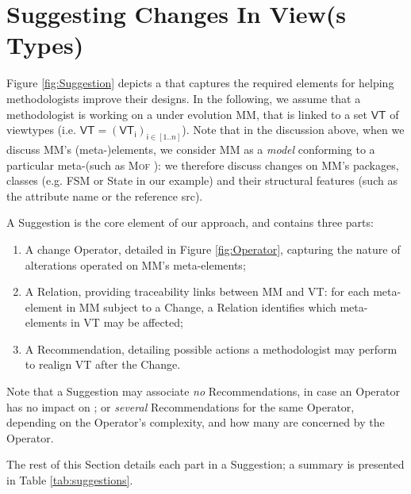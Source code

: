 \section{Suggesting Changes In View(s Types)}
\label{sec:Suggestion}

Figure \ref{fig:Suggestion} depicts a \metamodel that captures the
required elements for helping methodologists improve their designs.
In the following, we assume that a methodologist is working on a \metamodel
under evolution \textsf{MM}, that is linked to a set $\mathsf{VT}$ of viewtypes
(i.e. $\mathsf{VT} = (\mathsf{VT}_\mathsf{i})_{\mathsf{i}\in [1..n]}$). Note that in the discussion above, when we discuss
\textsf{MM}'s (meta-)elements, we consider \textsf{MM} as a \emph{model}
conforming to a particular meta-\metamodel (such as \textsc{Mof} \cite{TR:OMG-MOF:2016}):
we therefore discuss changes on \textsf{MM}'s packages, classes (e.g. 
\textsf{FSM} or \textsf{State} in our example) and their structural features
(such as the attribute \textsf{name} or the reference \textsf{src}).

A \textsf{Suggestion} is the core element of our approach, and contains three 
parts:
\begin{enumerate}
    \item A change \textsf{Operator}, detailed in Figure \ref{fig:Operator}, capturing the nature of
alterations operated on \textsf{MM}'s meta-elements; 
    \item A \textsf{Relation}, providing traceability links between \textsf{MM} and \textsf{VT}: for each meta-element in \textsf{MM} subject to a \textsf{Change}, a \textsf{Relation}
identifies which meta-elements in \textsf{VT} may be affected;
    \item A \textsf{Recommendation}, detailing possible actions a methodologist may perform to realign \textsf{VT} after the \textsf{Change}. 
\end{enumerate}

Note that a \textsf{Suggestion} may 
associate \emph{no} \textsf{Recommendation}s, in case an \textsf{Operator} has no
impact on \viewtypes; or \emph{several} \textsf{Recommendation}s for the same 
\textsf{Operator}, depending on the \textsf{Operator}'s complexity, and how 
many \viewtypes are concerned by the \textsf{Operator}.

The rest of this Section details each part in a \textsf{Suggestion}; a summary
is presented in Table \ref{tab:suggestions}.






